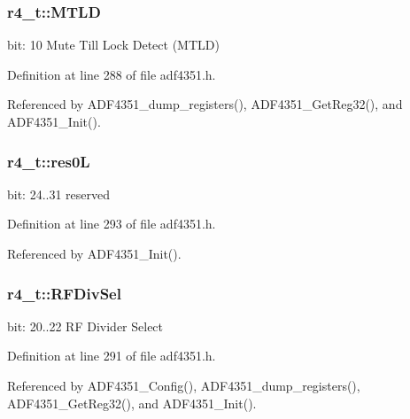 \subsubsection[{\texorpdfstring{M\+T\+LD}{MTLD}}]{ r4\+\_\+t\+::\+M\+T\+LD}\hypertarget{structr4__t_a899217c98d1c1eca8780186c8e44470c}{}\label{structr4__t_a899217c98d1c1eca8780186c8e44470c}
bit\+: 10 Mute Till Lock Detect (M\+T\+LD) 

Definition at line 288 of file adf4351.\+h.



Referenced by A\+D\+F4351\+\_\+dump\+\_\+registers(), A\+D\+F4351\+\_\+\+Get\+Reg32(), and A\+D\+F4351\+\_\+\+Init().

\subsubsection[{\texorpdfstring{res0L}{res0L}}]{ r4\+\_\+t\+::res0L}\hypertarget{structr4__t_a39447a9d51f096493dfc6d4a38bf3f9e}{}\label{structr4__t_a39447a9d51f096493dfc6d4a38bf3f9e}
bit\+: 24..31 reserved 

Definition at line 293 of file adf4351.\+h.



Referenced by A\+D\+F4351\+\_\+\+Init().

\subsubsection[{\texorpdfstring{R\+F\+Div\+Sel}{RFDivSel}}]{ r4\+\_\+t\+::\+R\+F\+Div\+Sel}\hypertarget{structr4__t_a6f0ef612a55877310aa2f07c9737e66b}{}\label{structr4__t_a6f0ef612a55877310aa2f07c9737e66b}
bit\+: 20..22 RF Divider Select 

Definition at line 291 of file adf4351.\+h.



Referenced by A\+D\+F4351\+\_\+\+Config(), A\+D\+F4351\+\_\+dump\+\_\+registers(), A\+D\+F4351\+\_\+\+Get\+Reg32(), and A\+D\+F4351\+\_\+\+Init().

